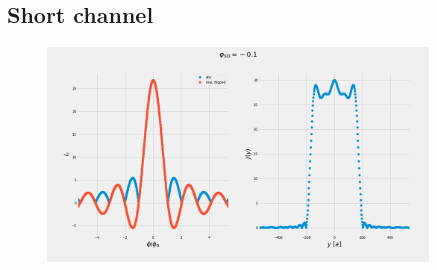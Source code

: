 \documentclass[a4paper]{article}
\begin{document}
\subsection{Short channel}
\begin{figure}
	\includegraphics[width=0.9\textwidth]{figs/wg32/current_and_density_01}
\end{figure}
\end{document}
